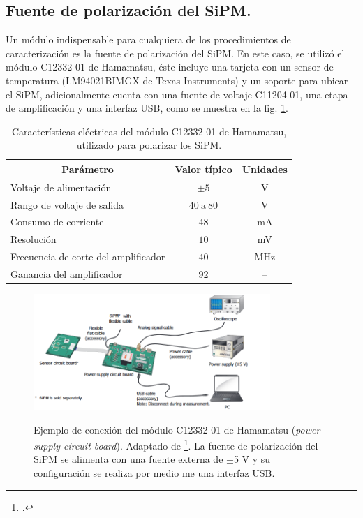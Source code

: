 \subsection{Fuente de polarización del SiPM.}
Un módulo indispensable para cualquiera de los procedimientos de caracterización es la fuente de polarización del SiPM. En este caso, se utilizó el módulo  C12332-01 de Hamamatsu, éste incluye una tarjeta con un sensor de temperatura (LM94021BIMGX de Texas Instruments)  y un soporte para ubicar el SiPM, adicionalmente cuenta con una fuente de voltaje C11204-01, una etapa de amplificación y una interfaz USB, como se muestra en la fig. \ref{fig:conexion_driverMPPC}.
\begin{table}[h!]
\caption{Características eléctricas del módulo  C12332-01 de Hamamatsu, utilizado para polarizar los SiPM.}
    \label{table_module_sorce}
	\centering
	\begin{tabular}{ c  c  c}
    \hline
    Parámetro       & Valor típico   & Unidades     \\ \hline
    \multicolumn{1}{l}{Voltaje de alimentación}     & $\pm 5$        & V        \\
    \multicolumn{1}{l}{Rango de voltaje de salida}      & $40~\mbox{a}~80$        & V          \\
    \multicolumn{1}{l}{Consumo de corriente}      & $48$        & mA          \\
    \multicolumn{1}{l}{Resolución}      & $10$        & mV          \\
    \multicolumn{1}{l}{Frecuencia de corte del amplificador}      & $40$        & MHz          \\
    \multicolumn{1}{l}{Ganancia del amplificador}      & $92$        &     --      \\ \hline
	\end{tabular}	
\end{table}
\begin{figure}[h!]
\begin{centering}
    \caption{Ejemplo de conexión del módulo C12332-01 de Hamamatsu (\textit{power supply circuit board}). Adaptado de \footcite{Driver_mppc}. La fuente de polarización del SiPM se alimenta con una fuente externa de $\pm$5 V  y su configuración se realiza por medio me una interfaz USB.}
   \includegraphics[width=0.8\textwidth]{Images/Source_module.PNG}
    \label{fig:conexion_driverMPPC}
  \par\end{centering}
\end{figure}
